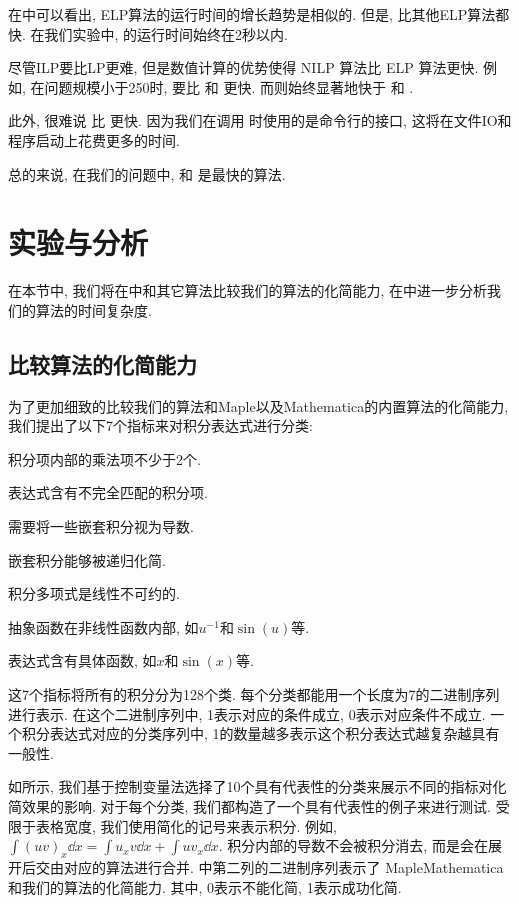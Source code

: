 在中可以看出, ELP算法的运行时间的增长趋势是相似的. 但是, 比其他ELP算法都快. 在我们实验中, 的运行时间始终在2秒以内. 

尽管ILP要比LP更难, 但是数值计算的优势使得 NILP 算法比 ELP 算法更快. 例如, 在问题规模小于250时,  要比  和 更快. 而则始终显著地快于 和 . 

此外, 很难说  比  更快. 因为我们在调用 时使用的是命令行的接口, 这将在文件IO和程序启动上花费更多的时间.

总的来说, 在我们的问题中,  和  是最快的算法.

\section{实验与分析} \label{Results-03}
在本节中, 我们将在中和其它算法比较我们的算法的化简能力, 在中进一步分析我们的算法的时间复杂度. 

\subsection{比较算法的化简能力}\label{sec5.1-03}
为了更加细致的比较我们的算法和Maple以及Mathematica的内置算法的化简能力, 我们提出了以下7个指标来对积分表达式进行分类:
\begin{compactenum}[1) ]
\item 积分项内部的乘法项不少于2个.
\item 表达式含有不完全匹配的积分项.
\item 需要将一些嵌套积分视为导数. 
\item 嵌套积分能够被递归化简.
\item 积分多项式是线性不可约的.
\item 抽象函数在非线性函数内部, 如$u^{-1}$和$\sin(u)$等.  
\item 表达式含有具体函数, 如$x$和$\sin(x)$等. 
\end{compactenum} 
这7个指标将所有的积分分为128个类. 每个分类都能用一个长度为7的二进制序列进行表示. 在这个二进制序列中, 1表示对应的条件成立, 0表示对应条件不成立. 一个积分表达式对应的分类序列中, 1的数量越多表示这个积分表达式越复杂\D 越具有一般性. 

如所示, 我们基于控制变量法选择了10个具有代表性的分类来展示不同的指标对化简效果的影响. 对于每个分类, 我们都构造了一个具有代表性的例子来进行测试. 受限于表格宽度, 我们使用简化的记号来表示积分. 例如, $\int\!{(uv)_x\dd x}=\int\!{u_xv\dd x}+\int\!{uv_x\dd x}$. 积分内部的导数不会被积分消去, 而是会在展开后交由对应的算法进行合并. 中第二列的二进制序列表示了 Maple\D Mathematica 和我们的算法的化简能力. 其中, 0表示不能化简, 1表示成功化简. 

